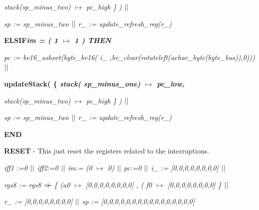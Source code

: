 \documentclass[11pt]{article} %
\begin{document}
\begin{sloppypar}
\hspace*{0.10in}\it stack\rm (\it sp\_minus\_two\rm )  $\mapsto$  \it pc\_high
\rm \} \rm )  $\mbox{$\mid\mid$}$

\hspace*{0.10in}\it sp \rm := \it sp\_minus\_two  $\mbox{$\mid\mid$}$ \hspace*{0.10in}\it
r\_ \rm := \it update\_refresh\_reg\rm (\it r\_\rm )\hspace*{0.85in}

\hspace*{0.00in}\bf ELSIF\hspace*{0.10in}\it im \rm = \rm ( \rm 1  $\mapsto$ 
\rm 1 \rm ) \bf THEN  \hspace*{0.70in}

\hspace*{0.10in}\it pc \rm := \it bv16\_ushort\rm (\it byte\_bv16\rm ( \it i\_
\rm ,\it bv\_clear\rm (\it rotateleft\rm (\it uchar\_byte\rm (\it byte\_bus\rm )\rm )\rm ,\rm 0\rm )\rm )\rm )$\mbox{$\mid\mid$}$

\hspace*{0.10in}\bf updateStack\rm ( \rm \{ \it stack\rm ( \it
sp\_minus\_one\rm )  $\mapsto$  \it pc\_low\rm ,

\hspace*{0.10in}\it stack\rm (\it sp\_minus\_two\rm )  $\mapsto$  \it pc\_high
\rm \} \rm )  $\mbox{$\mid\mid$}$

\hspace*{0.10in}\it sp \rm := \it sp\_minus\_two  $\mbox{$\mid\mid$}$ \hspace*{0.10in}\it
r\_ \rm := \it update\_refresh\_reg\rm (\it r\_\rm )

\hspace*{0.00in}\bf END\hspace*{0.10in}\\
\end{sloppypar}


\textbf{RESET}  - This just reset the registers related to the interruptions.

\begin{sloppypar}
\it iff1 \rm :=\rm 0 $\mbox{$\mid\mid$}$ \it iff2\rm :=\rm 0 $\mbox{$\mid\mid$}$  \it  im\rm := \rm (\rm 0 $\mapsto$ \rm 0\rm )  $\mbox{$\mid\mid$}$ 
\it pc\rm :=\rm 0 $\mbox{$\mid\mid$}$ \it i\_ \rm := [0,0,0,0,0,0,0,0] $\mbox{$\mid\mid$}$

\it rgs8 \rm := \it rgs8  $\lover$  \rm \{ \rm (\it a0  $\mapsto$ \rm [0,0,0,0,0,0,0,0] , \rm (\it
f0 $\mapsto$ \rm [0,0,0,0,0,0,0,0] \rm \} $\mbox{$\mid\mid$}$

\it r\_  \rm := [0,0,0,0,0,0,0,0] $\mbox{$\mid\mid$}$ \it sp \rm := [0,0,0,0,0,0,0,0,0,0,0,0,0,0,0,0]
\end{sloppypar}
\end{document}

